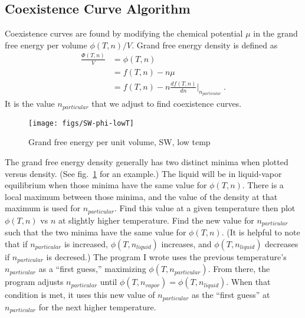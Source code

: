 \documentclass[letterpaper,twocolumn,amsmath,amssymb,prb]{revtex4-1}
\newcommand{\npart}{\ensuremath{n_{particular}}}
\newcommand{\nliq}{\ensuremath{n_{liquid}}}
\newcommand{\nvap}{\ensuremath{n_{vapor}}}
\newcommand{\1}{\ensuremath{\textbf{r}_1}}
\newcommand{\2}{\ensuremath{\textbf{r}_2}}
\begin{document}
\subsection{Coexistence Curve Algorithm}\label{subsec:coexis}
Coexistence curves are found by modifying the chemical potential $\mu$
in the grand free energy per volume $\phi(T,n)/V$. Grand free energy
density is defined as
\begin{align}
  \frac{\Phi(T,n)}{V} &= \phi(T,n) \nonumber \\
                 &= f(T,n) - n\mu \nonumber \\
                 &= f(T,n) - n\frac{df(T,n)}{dn}\bigg|_{\npart}\ .
\end{align}
It is the value $\npart$ that we adjust to find coexistence curves.

\begin{figure}
  \centering
  \texttt{[image: figs/SW-phi-lowT]}
  \caption{Grand free energy per unit volume, SW, low temp}
  \label{fig:SW-phi-lowT}
\end{figure}

The grand free energy density generally has two distinct minima when
plotted versus density. (See fig.~\ref{fig:SW-phi-lowT} for an example.) The liquid will be in liquid-vapor equilibrium
when those minima have the same value for $\phi(T,n)$. There is a local
maximum between those minima, and the value of the density at that
maximum is used for $\npart$. Find this value at a given temperature
then plot $\phi(T,n)$ vs $n$ at slightly higher temperature. Find the new
value for $\npart$ such that the two minima have the same value for
$\phi(T,n)$. (It is helpful to note that if $\npart$ is increased,
$\phi(T,\nliq)$ increases, and $\phi(T,\nliq)$ decreases if $\npart$ is
decresed.) The program I wrote uses the previous
temperature's $\npart$ as a ``first guess,'' maximizing
$\phi(T,\npart)$. From there, the program adjusts $\npart$
until $\phi(T,\nvap) = \phi(T,\nliq)$. When that condition is met, it
uses this new value of $\npart$ as the ``first guess'' at $\npart$ for the next
higher temperature.
\end{document}
